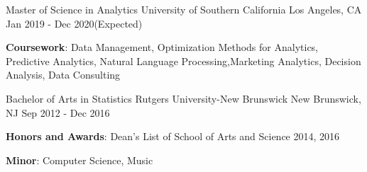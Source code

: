 
\begin{cventries}
  \cventry
    {Master of Science in Analytics} %
    {University of Southern California} %
    {Los Angeles, CA} %
    {Jan 2019 - Dec 2020(Expected)} %
    {
      \begin{cvitems} %
         \item {\textbf{Coursework}: Data Management, Optimization Methods for Analytics, Predictive Analytics, Natural Language Processing,Marketing Analytics, Decision Analysis, Data Consulting}
      \end{cvitems}
    }
    
    \cventry
    {Bachelor of Arts in Statistics} %
    {Rutgers University-New Brunswick} %
    {New Brunswick, NJ} %
    {Sep 2012 - Dec 2016} %
    {
      \begin{cvitems} %
         \item {\textbf{Honors and Awards}: Dean’s List of School of Arts and Science 2014, 2016}
         \item {\textbf{Minor}: Computer Science, Music}
      \end{cvitems}
    }
\end{cventries}
